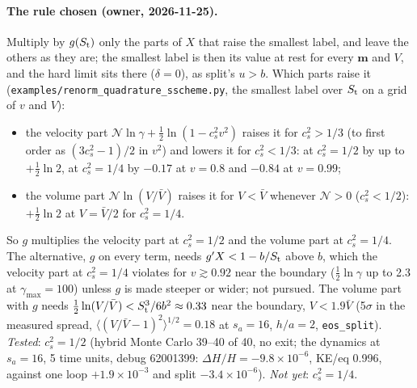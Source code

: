 \documentclass[11pt,aps,preprint,nofootinbib,superscriptaddress,tightenlines]{revtex4-2}
\let\oldparagraph\paragraph
\renewcommand{\paragraph}{\par\bigskip\oldparagraph}
\begin{document}
\paragraph{The rule chosen (owner, 2026-11-25).}  Multiply by $g(S_{\rm t})$ only the parts of $X$ that raise the smallest label, and leave the others
as they are; the smallest label is then its value at rest for every $\bm m$ and $V$, and the hard limit sits there ($\delta=0$), as split's $u>b$.  Which
parts raise it (\nolinkurl{examples/renorm_quadrature_sscheme.py}, the smallest label over $S_{\rm t}$ on a grid of $v$ and $V$):
\begin{itemize}
\item the velocity part $\mathcal N\ln\gamma+\tfrac12\ln(1-c_s^2v^2)$ raises it for $c_s^2>1/3$ (to first order as $(3c_s^2-1)/2$ in $v^2$) and
  lowers it for $c_s^2<1/3$: at $c_s^2=1/2$ by up to $+\tfrac12\ln2$, at $c_s^2=1/4$ by $-0.17$ at $v=0.8$ and $-0.84$ at $v=0.99$;
\item the volume part $\mathcal N\ln(V/\bar V)$ raises it for $V<\bar V$ whenever $\mathcal N>0$ ($c_s^2<1/2$): $+\tfrac12\ln2$ at $V=\bar V/2$ for $c_s^2=1/4$.
\end{itemize}
So $g$ multiplies the velocity part at $c_s^2=1/2$ and the volume part at $c_s^2=1/4$.  The alternative, $g$ on every term, needs
$g'X<1-b/S_{\rm t}$ above $b$, which the velocity part at $c_s^2=1/4$ violates for $v\gtrsim0.92$ near the boundary ($\tfrac12\ln\gamma$ up to 2.3 at
$\gamma_{\max}=100$) unless $g$ is made steeper or wider; not pursued.  The volume part with $g$ needs $\tfrac12\ln(V/\bar V)<S_{\rm t}^3/6b^2\approx0.33$
near the boundary, $V<1.9\bar V$ (5$\sigma$ in the measured spread, $\langle(V/\bar V-1)^2\rangle^{1/2}=0.18$ at $s_a=16$, $h/a=2$, \texttt{eos\_split}).
\emph{Tested}: $c_s^2=1/2$ (hybrid Monte Carlo 39--40 of 40, no exit; the dynamics at $s_a=16$, 5 time units, debug 62001399: $\Delta H/H=-9.8\times10^{-6}$,
KE/eq 0.996, against one loop $+1.9\times10^{-3}$ and split $-3.4\times10^{-6}$).  \emph{Not yet}: $c_s^2=1/4$.
\end{document}
